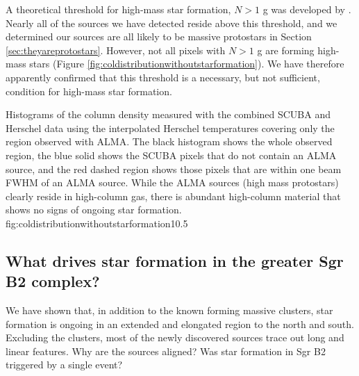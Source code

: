 \documentclass[twocolumn]{aastex61}
\begin{document}
A theoretical threshold for high-mass star formation, $N > 1$ g \persc was
developed by \citet{Krumholz2008a}.   Nearly all of the sources we have
detected reside above this threshold, and we determined our sources are all
likely to be massive protostars in Section \ref{sec:theyareprotostars}.
However, not all pixels with $N > 1$ g \persc are forming high-mass stars
(Figure \ref{fig:coldistributionwithoutstarformation}).  We
have therefore apparently confirmed that this threshold is a necessary, but not
sufficient, condition for high-mass star formation.



{Histograms of the column density measured with the combined SCUBA and Herschel
data using the interpolated Herschel temperatures covering only the region
observed with ALMA.  The black histogram shows the whole observed region,
the blue solid shows the SCUBA pixels that do not contain an ALMA source,
and the red dashed region shows those pixels that are within one beam
FWHM of an ALMA source.  While the ALMA sources (high mass protostars)
clearly reside in high-column gas, there is abundant high-column material
that shows no signs of ongoing star formation.}
{fig:coldistributionwithoutstarformation}{1}{0.5\textwidth}

\subsection{What drives star formation in the greater Sgr B2 complex?}
\label{sec:whatdrives}
We have shown that, in addition to the known forming massive clusters,
star formation is ongoing in an extended and elongated region to the north
and south.  Excluding the clusters, most of the newly discovered sources
trace out long and linear features.  Why are the sources aligned?
Was star formation in Sgr B2 triggered by a single event?
\end{document}
